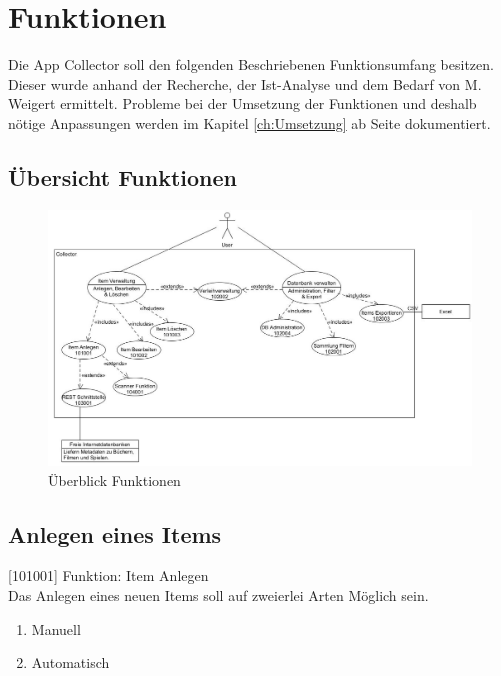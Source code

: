 \section{Funktionen}

Die App Collector soll den folgenden Beschriebenen Funktionsumfang besitzen. Dieser wurde anhand der Recherche, der Ist-Analyse und dem Bedarf von M. Weigert ermittelt. Probleme bei der Umsetzung der Funktionen und deshalb nötige Anpassungen werden im Kapitel \ref{ch:Umsetzung} ab Seite \pageref{ch:Umsetzung} dokumentiert.

\newpage

\begin{landscape}
	\section{Übersicht Funktionen}
	\label{sec:UebersichtFunktion}
	\begin{figure}[htbp]
		\centering
		\includegraphics[scale=0.65]{pic/SystemUseCase}
		\caption{Überblick Funktionen}
	\end{figure}
\end{landscape}

\subsection{Anlegen eines Items}

[101001] Funktion: Item Anlegen\\

Das Anlegen eines neuen Items soll auf zweierlei Arten Möglich sein.

\begin{enumerate}
	\item Manuell
	\item Automatisch
\end{enumerate}

